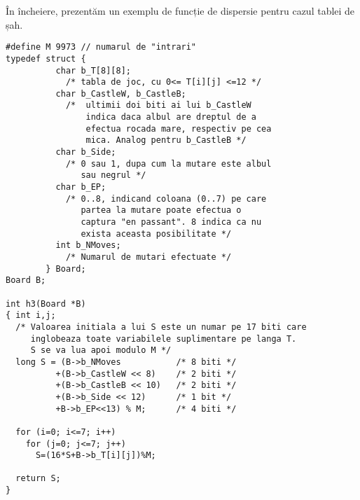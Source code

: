 În încheiere, prezentăm un exemplu de funcție de dispersie pentru cazul tablei
de șah.

\begin{verbatim}
#define M 9973 // numarul de "intrari"
typedef struct {
          char b_T[8][8];
            /* tabla de joc, cu 0<= T[i][j] <=12 */
          char b_CastleW, b_CastleB;
            /*  ultimii doi biti ai lui b_CastleW
                indica daca albul are dreptul de a
                efectua rocada mare, respectiv pe cea
                mica. Analog pentru b_CastleB */
          char b_Side;
            /* 0 sau 1, dupa cum la mutare este albul
               sau negrul */
          char b_EP;
            /* 0..8, indicand coloana (0..7) pe care
               partea la mutare poate efectua o
               captura "en passant". 8 indica ca nu
               exista aceasta posibilitate */
          int b_NMoves;
            /* Numarul de mutari efectuate */
        } Board;
Board B;

int h3(Board *B)
{ int i,j;
  /* Valoarea initiala a lui S este un numar pe 17 biti care
     inglobeaza toate variabilele suplimentare pe langa T.
     S se va lua apoi modulo M */
  long S = (B->b_NMoves           /* 8 biti */
          +(B->b_CastleW << 8)    /* 2 biti */
          +(B->b_CastleB << 10)   /* 2 biti */
          +(B->b_Side << 12)      /* 1 bit */
          +B->b_EP<<13) % M;      /* 4 biti */

  for (i=0; i<=7; i++)
    for (j=0; j<=7; j++)
      S=(16*S+B->b_T[i][j])%M;

  return S;
}
\end{verbatim}

